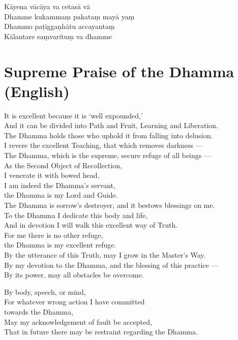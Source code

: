 \clearpage


Kāyena vācāya va cetasā vā\\
Dhamme kukammaṃ pakataṃ mayā yaṃ\\
Dhammo paṭiggaṇhātu accayantaṃ\\
Kālantare saṃvarituṃ va dhamme

\section*{Supreme Praise of the Dhamma (English)}

\begin{leader}
\end{leader}

It is excellent because it is `well expounded,'\\
And it can be divided into Path and Fruit, Learning and Liberation.\\
The Dhamma holds those who uphold it from falling into delusion.\\
I revere the excellent Teaching, that which removes darkness ---\\
The Dhamma, which is the supreme, secure refuge of all beings ---\\
As the Second Object of Recollection,\\\vin I venerate it with bowed head.\\
I am indeed the Dhamma's servant,\\\vin the Dhamma is my Lord and Guide.\\
The Dhamma is sorrow's destroyer, and it bestows blessings on me.\\
To the Dhamma I dedicate this body and life,\\
And in devotion I will walk this excellent way of Truth.\\
For me there is no other refuge,\\\vin the Dhamma is my excellent refuge.\\
By the utterance of this Truth, may I grow in the Master's Way.\\
By my devotion to the Dhamma, and the blessing of this practice ---\\
By its power, may all obstacles be overcome.

\clearpage


By body, speech, or mind,\\
For whatever wrong action I have committed\\\vin towards the Dhamma,\\
May my acknowledgement of fault be accepted,\\
That in future there may be restraint regarding the Dhamma.

